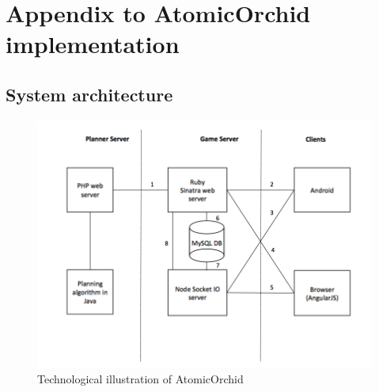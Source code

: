 \chapter{Appendix to AtomicOrchid implementation}


\section{System architecture}
\begin{figure}[H]
  \centering
  \includegraphics[width=1\textwidth]{img/Appendix/SystemDescription}
  \caption{Technological illustration of AtomicOrchid}
  \label{fig:systemDescription}
\end{figure}

